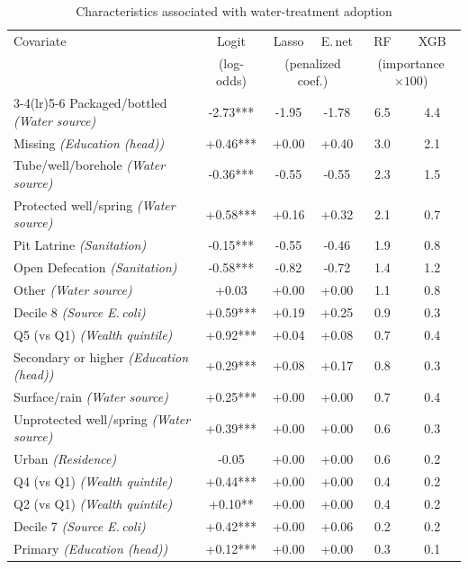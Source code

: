 \begin{table}[htbp]
\centering
\caption{Characteristics associated with water-treatment adoption}
\label{tab:treatment-predictors}
\small\setlength{\tabcolsep}{5pt}
\begin{tabular}{lccccc}
\toprule
Covariate & Logit & Lasso & E.\,net & RF & XGB \\
 & (log-odds) & \multicolumn{2}{c}{(penalized coef.)} & \multicolumn{2}{c}{(importance $\times100$)} \\
\cmidrule(lr){3-4}\cmidrule(lr){5-6}
\midrule
Packaged/bottled \textit{(Water source)} & -2.73*** & -1.95 & -1.78 & 6.5 & 4.4 \\
Missing \textit{(Education (head))} & +0.46*** & +0.00 & +0.40 & 3.0 & 2.1 \\
Tube/well/borehole \textit{(Water source)} & -0.36*** & -0.55 & -0.55 & 2.3 & 1.5 \\
Protected well/spring \textit{(Water source)} & +0.58*** & +0.16 & +0.32 & 2.1 & 0.7 \\
Pit Latrine \textit{(Sanitation)} & -0.15*** & -0.55 & -0.46 & 1.9 & 0.8 \\
Open Defecation \textit{(Sanitation)} & -0.58*** & -0.82 & -0.72 & 1.4 & 1.2 \\
Other \textit{(Water source)} & +0.03 & +0.00 & +0.00 & 1.1 & 0.8 \\
Decile 8 \textit{(Source E.\,coli)} & +0.59*** & +0.19 & +0.25 & 0.9 & 0.3 \\
Q5 (vs Q1) \textit{(Wealth quintile)} & +0.92*** & +0.04 & +0.08 & 0.7 & 0.4 \\
Secondary or higher \textit{(Education (head))} & +0.29*** & +0.08 & +0.17 & 0.8 & 0.3 \\
Surface/rain \textit{(Water source)} & +0.25*** & +0.00 & +0.00 & 0.7 & 0.4 \\
Unprotected well/spring \textit{(Water source)} & +0.39*** & +0.00 & +0.00 & 0.6 & 0.3 \\
Urban \textit{(Residence)} & -0.05 & +0.00 & +0.00 & 0.6 & 0.2 \\
Q4 (vs Q1) \textit{(Wealth quintile)} & +0.44*** & +0.00 & +0.00 & 0.4 & 0.2 \\
Q2 (vs Q1) \textit{(Wealth quintile)} & +0.10** & +0.00 & +0.00 & 0.4 & 0.2 \\
Decile 7 \textit{(Source E.\,coli)} & +0.42*** & +0.00 & +0.06 & 0.2 & 0.2 \\
Primary \textit{(Education (head))} & +0.12*** & +0.00 & +0.00 & 0.3 & 0.1 \\

\end{tabular}
\end{table}
